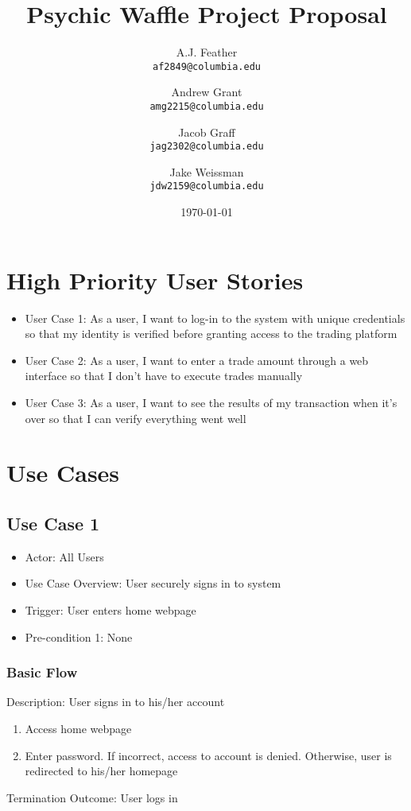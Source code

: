 \documentclass{article}
\title{Psychic Waffle Project Proposal}
\author{
    A.J. Feather\\
    \texttt{af2849@columbia.edu}
    \and
    Andrew Grant\\
    \texttt{amg2215@columbia.edu}
    \and
    Jacob Graff\\
    \texttt{jag2302@columbia.edu}
    \and
    Jake Weissman\\
    \texttt{jdw2159@columbia.edu}
}
\date{\today}
\begin{document}
\maketitle

\section{High Priority User Stories}
\begin{itemize}
\item User Case 1: As a user, I want to log-in to the system with unique credentials so that my identity is verified before granting access to the trading platform
\item User Case 2: As a user, I want to enter a trade amount through a web interface so that I don't have to execute trades manually
\item User Case 3: As a user, I want to see the results of my transaction when it's over so that I can verify everything went well
\end{itemize}

\section{Use Cases}

\subsection{Use Case 1}
\begin{itemize}
\item Actor: All Users
\item Use Case Overview: User securely signs in to system
\item Trigger: User enters home webpage
\item Pre-condition 1: None
\end{itemize}

\subsubsection{Basic Flow}
Description: User signs in to his/her account
\begin{enumerate}
\item Access home webpage
\item Enter password. If incorrect, access to account is denied. Otherwise, user is redirected to his/her homepage
\end{enumerate}
Termination Outcome: User logs in
\end{document}
